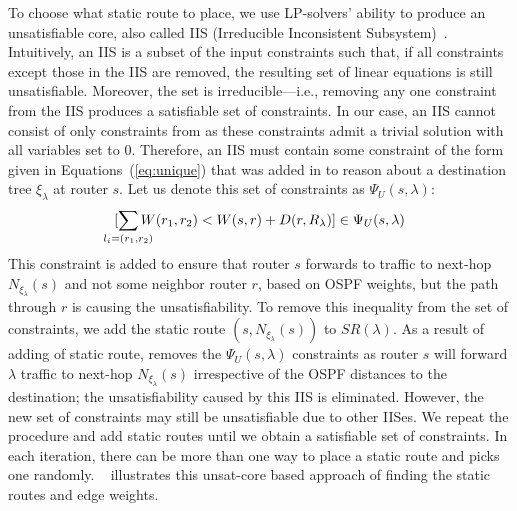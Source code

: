 To choose what static route to place, we use
LP-solvers' ability to produce an
unsatisfiable core, also called IIS (Irreducible Inconsistent Subsystem)~\cite{chinneck2007feasibility}. 
Intuitively, an IIS is a subset of the input constraints such that,
if all constraints except those in the IIS are removed, the resulting set of
linear equations is still unsatisfiable. Moreover, the set is irreducible---i.e., removing 
any one constraint from the IIS produces a satisfiable set of constraints. 
In our case, an IIS cannot consist of only 
constraints from  as these constraints
admit a trivial solution with all variables set to 0. 
Therefore, an IIS must contain some constraint of the form
given in Equations~(\ref{eq:unique})
that was added in to reason about a destination tree $\xi_\lambda$
at router $s$. Let us denote 
this set of constraints as $\Psi_U(s, \lambda)$:
\[
[\sum_{\mathclap{\substack{l_i=(r_1,r_2)}}} 
W(r_1, r_2) < W(s, r) + D(r, R_\lambda) ] \in \Psi_U(s, \lambda)
\]	
This constraint is added to ensure 
that router $s$ forwards to traffic to next-hop
$N_{\xi_\lambda}(s)$ and not some neighbor router 
$r$, based on OSPF weights,
but the path through $r$ is causing the unsatisfiability. 
To remove this inequality from the set of constraints, 
we add the static route $(s,N_{\xi_\lambda}(s))$ to $SR(\lambda)$.
As a result of adding of static route, \name removes 
the $\Psi_U(s, \lambda)$ constraints as router $s$ 
will forward $\lambda$ traffic  to 
next-hop $N_{\xi_\lambda}(s)$ irrespective of
the OSPF distances to the destination; the 
unsatisfiability caused by this IIS is eliminated. 
However, the new set of
constraints may still be unsatisfiable due to other IISes.
We repeat the procedure and add static routes
until we obtain a satisfiable set of
constraints. 
In each iteration, there can be more than one way to place a static route and
\name picks one randomly. ~ illustrates
this unsat-core based approach of finding the static routes and edge weights.
